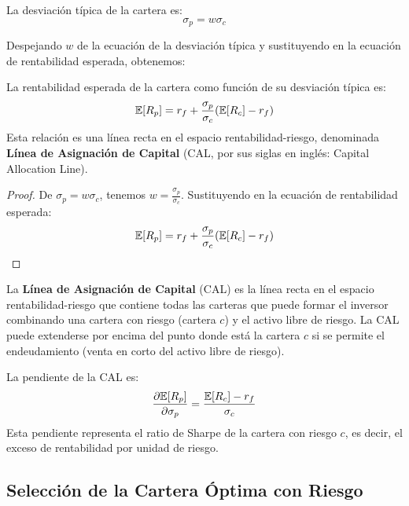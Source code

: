 La desviación típica de la cartera es:
\begin{equation}
\sigma_p = w \sigma_c
\end{equation}

Despejando $w$ de la ecuación de la desviación típica y sustituyendo en la ecuación de rentabilidad esperada, obtenemos:

\begin{teorema}
La rentabilidad esperada de la cartera como función de su desviación típica es:
\begin{equation}
\mathbb{E}[R_p] = r_f + \frac{\sigma_p}{\sigma_c} (\mathbb{E}[R_c] - r_f)
\end{equation}
Esta relación es una línea recta en el espacio rentabilidad-riesgo, denominada \textbf{Línea de Asignación de Capital} (CAL, por sus siglas en inglés: Capital Allocation Line).
\end{teorema}

\begin{proof}
De $\sigma_p = w \sigma_c$, tenemos $w = \frac{\sigma_p}{\sigma_c}$. Sustituyendo en la ecuación de rentabilidad esperada:
$$\mathbb{E}[R_p] = r_f + \frac{\sigma_p}{\sigma_c} (\mathbb{E}[R_c] - r_f)$$
\end{proof}

\begin{definicion}
La \textbf{Línea de Asignación de Capital} (CAL) es la línea recta en el espacio rentabilidad-riesgo que contiene todas las carteras que puede formar el inversor combinando una cartera con riesgo (cartera $c$) y el activo libre de riesgo. La CAL puede extenderse por encima del punto donde está la cartera $c$ si se permite el endeudamiento (venta en corto del activo libre de riesgo).
\end{definicion}

\begin{proposicion}
La pendiente de la CAL es:
\begin{equation}
\frac{\partial \mathbb{E}[R_p]}{\partial \sigma_p} = \frac{\mathbb{E}[R_c] - r_f}{\sigma_c}
\end{equation}
Esta pendiente representa el ratio de Sharpe de la cartera con riesgo $c$, es decir, el exceso de rentabilidad por unidad de riesgo.
\end{proposicion}

\subsection{Selección de la Cartera Óptima con Riesgo}


